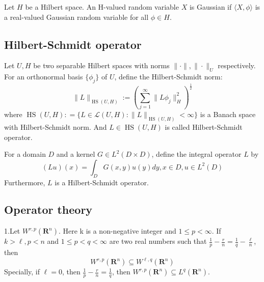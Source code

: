 \begin{theorem}
\begin{definition}
    Let $H$ be a Hilbert space. An H-valued random variable $X$ is Gaussian if 
    $\langle X, \phi\rangle$ is a real-valued Gaussian random variable for all $\phi \in H$.
\end{definition}
\subsection{Hilbert-Schmidt operator}
\begin{definition}
    Let $U, H$ be two separable Hilbert spaces with norms $\|\cdot\|, \|\cdot\|_U$ respectively. 
    For an orthonormal basis $\{\phi_j\}$ of $U$, define the Hilbert-Schmidt norm:
    \begin{equation}
        \|L\|_{\operatorname{HS}(U, H)}:=\left(\sum_{j=1}^\infty \|L\phi_j\|_H^2\right)^{\frac{1}{2}}
    \end{equation}
    where $\operatorname{HS}(U, H): = \{L\in \mathcal{L}(U, H): \|L\|_{\operatorname{HS}(U, H)}<\infty\}$ is a Banach space with Hilbert-Schmidt norm.
    And $L\in \operatorname{HS}(U, H)$ is called Hilbert-Schmidt operator.
\end{definition}
\begin{definition}
    For a domain $D$ and a kernel $G\in L^2(D\times D)$, define the integral operator $L$ by
    \begin{equation}
        (Lu)(x) = \int_D G(x, y)u(y)dy, x\in D, u\in L^2(D)
    \end{equation}
    Furthermore, $L$ is a Hilbert-Schmidt operator.
\end{definition}

\subsection{Operator theory}
\begin{theorem}
    1.Let $W^{r, p}\left(\mathbf{R}^{n}\right)$. Here k is a non-negative integer and $1 \leq p<\infty$. 
    If $k>\ell, p<n$ and $1 \leq p<q<\infty$ are two real numbers such that
    $\frac{1}{p}-\frac{r}{n}=\frac{1}{q}-\frac{\ell}{n}$, then
    \begin{equation}
        W^{r, p}\left(\mathbf{R}^{n}\right) \subseteq W^{\ell, q}\left(\mathbf{R}^{n}\right)
    \end{equation}
    Specially, if $\ell = 0$, then $\frac{1}{p}-\frac{r}{n}=\frac{1}{q}$, then $W^{r, p}\left(\mathbf{R}^{n}\right) \subseteq L^q\left(\mathbf{R}^{n}\right)$.


\end{theorem}
\end{theorem}
